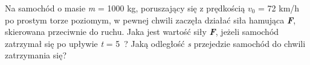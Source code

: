 Na samochód o masie \emph{m} = 1000 kg, poruszający się z prędkością \emph{$v_0$} = 72 km/h po prostym torze poziomym, w pewnej chwili zaczęła działać siła hamująca \textbf{\emph{F}}, skierowana przeciwnie do ruchu. Jaka jest wartość siły \textbf{\emph{F}}, jeżeli samochód zatrzymał się po upływie \emph{t} = 5~? Jaką odległość \emph{s} przejedzie samochód do chwili zatrzymania się?
